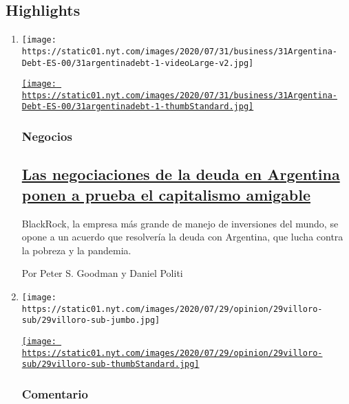 \hypertarget{highlights}{%
\subsection{Highlights}\label{highlights}}

\begin{enumerate}
\def\labelenumi{\arabic{enumi}.}
\item
  \texttt{[image: https://static01.nyt.com/images/2020/07/31/business/31Argentina-Debt-ES-00/31argentinadebt-1-videoLarge-v2.jpg]}

  \href{/es/2020/07/31/espanol/negocios/argentina-deuda.html}{\texttt{[image: https://static01.nyt.com/images/2020/07/31/business/31Argentina-Debt-ES-00/31argentinadebt-1-thumbStandard.jpg]}}

  \hypertarget{negocios}{%
  \subsubsection{Negocios}\label{negocios}}

  \hypertarget{las-negociaciones-de-la-deuda-en-argentina-ponen-a-prueba-el-capitalismo-amigable}{%
  \subsection{\texorpdfstring{\href{/es/2020/07/31/espanol/negocios/argentina-deuda.html}{Las
  negociaciones de la deuda en Argentina ponen a prueba el capitalismo
  amigable}}{Las negociaciones de la deuda en Argentina ponen a prueba el capitalismo amigable}}\label{las-negociaciones-de-la-deuda-en-argentina-ponen-a-prueba-el-capitalismo-amigable}}

  BlackRock, la empresa más grande de manejo de inversiones del mundo,
  se opone a un acuerdo que resolvería la deuda con Argentina, que lucha
  contra la pobreza y la pandemia.

  Por Peter S. Goodman y Daniel Politi
\item
  \texttt{[image: https://static01.nyt.com/images/2020/07/29/opinion/29villoro-sub/29villoro-sub-jumbo.jpg]}

  \href{/es/2020/07/30/espanol/opinion/aztecas-violencia-narco-amlo.html}{\texttt{[image: https://static01.nyt.com/images/2020/07/29/opinion/29villoro-sub/29villoro-sub-thumbStandard.jpg]}}

  \hypertarget{comentario}{%
  \subsubsection{Comentario}\label{comentario}}


\end{enumerate}
